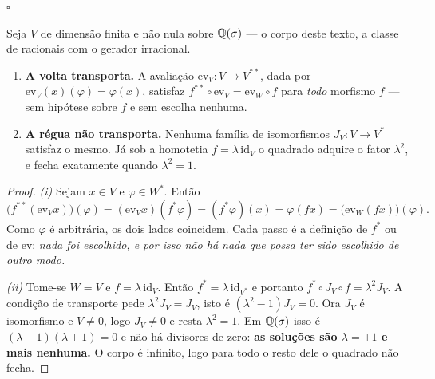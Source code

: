 \documentclass[livro.tex]{subfiles}
\begin{document}
\begin{teorema}
$\square$
\end{teorema}

\begin{teorema}\label{thm:transporte}
Seja $V$ de dimensão finita e não nula sobre $\mathbb Q(\sigma)$ --- o corpo deste texto, a classe de
racionais com o gerador irracional.
\begin{enumerate}\itemsep2pt
\item[(i)] \textbf{A volta transporta.} A avaliação $\mathrm{ev}_{V}\colon V\to V^{**}$, dada por
$\mathrm{ev}_{V}(x)(\varphi)=\varphi(x)$, satisfaz $f^{**}\circ\mathrm{ev}_{V}=\mathrm{ev}_{W}\circ f$
para \emph{todo} morfismo $f$ --- sem hipótese sobre $f$ e sem escolha nenhuma.
\item[(ii)] \textbf{A régua não transporta.} Nenhuma família de isomorfismos $J_{V}\colon V\to V^{*}$
satisfaz o mesmo. Já sob a homotetia $f=\lambda\,\mathrm{id}_{V}$ o quadrado adquire o fator
$\lambda^{2}$, e fecha exatamente quando $\lambda^{2}=1$.
\end{enumerate}
\end{teorema}

\begin{proof}
\emph{(i)} Sejam $x\in V$ e $\varphi\in W^{*}$. Então
\[
\bigl(f^{**}(\mathrm{ev}_{V}x)\bigr)(\varphi)
=(\mathrm{ev}_{V}x)(f^{*}\varphi)
=(f^{*}\varphi)(x)
=\varphi(fx)
=\bigl(\mathrm{ev}_{W}(fx)\bigr)(\varphi).
\]
Como $\varphi$ é arbitrária, os dois lados coincidem. Cada passo é a definição de $f^{*}$ ou de
$\mathrm{ev}$: \emph{nada foi escolhido, e por isso não há nada que possa ter sido escolhido de outro
modo.}

\smallskip
\emph{(ii)} Tome-se $W=V$ e $f=\lambda\,\mathrm{id}_{V}$. Então $f^{*}=\lambda\,\mathrm{id}_{V^{*}}$ e
portanto $f^{*}\circ J_{V}\circ f=\lambda^{2}J_{V}$. A condição de transporte pede
$\lambda^{2}J_{V}=J_{V}$, isto é $(\lambda^{2}-1)J_{V}=0$. Ora $J_{V}$ é isomorfismo e $V\neq 0$, logo
$J_{V}\neq 0$ e resta $\lambda^{2}=1$. Em $\mathbb Q(\sigma)$ isso é $(\lambda-1)(\lambda+1)=0$ e não há
divisores de zero: \textbf{as soluções são $\lambda=\pm1$ e mais nenhuma.} O corpo é infinito, logo
para todo o resto dele o quadrado não fecha.
\end{proof}
\end{document}
